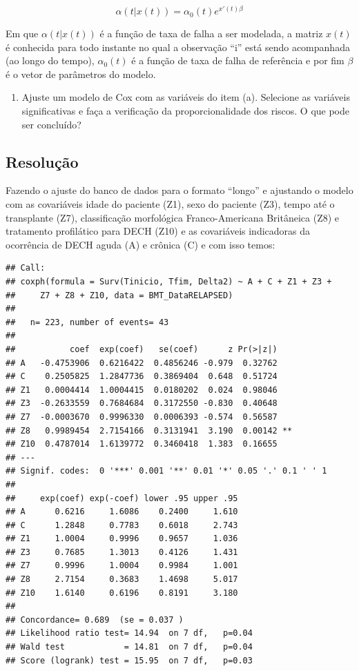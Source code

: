 \documentclass[]{article}
\providecommand{\tightlist}{%
  \setlength{\itemsep}{0pt}\setlength{\parskip}{0pt}}
\begin{document}
\[\alpha(t|x(t))=\alpha_0(t)e^{x'(t)\beta}\]

Em que \(\alpha(t|x(t))\) é a função de taxa de falha a ser modelada, a
matriz \(x(t)\) é conhecida para todo instante no qual a observação
``i'' está sendo acompanhada (ao longo do tempo), \(\alpha_0(t)\) é a
função de taxa de falha de referência e por fim \(\beta\) é o vetor de
parâmetros do modelo.

\begin{enumerate}
\def\labelenumi{(\alph{enumi})}
\setcounter{enumi}{1}
\tightlist
\item
  Ajuste um modelo de Cox com as variáveis do item (a). Selecione as
  variáveis significativas e faça a verificação da proporcionalidade dos
  riscos. O que pode ser concluído?
\end{enumerate}

\subsection{Resolução}\label{resolucao-1}

Fazendo o ajuste do banco de dados para o formato ``longo'' e ajustando
o modelo com as covariáveis idade do paciente (Z1), sexo do paciente
(Z3), tempo até o transplante (Z7), classificação morfológica
Franco-Americana Britâneica (Z8) e tratamento profilático para DECH
(Z10) e as covariáveis indicadoras da ocorrência de DECH aguda (A) e
crônica (C) e com isso temos:

\begin{verbatim}
## Call:
## coxph(formula = Surv(Tinicio, Tfim, Delta2) ~ A + C + Z1 + Z3 + 
##     Z7 + Z8 + Z10, data = BMT_DataRELAPSED)
## 
##   n= 223, number of events= 43 
## 
##           coef  exp(coef)   se(coef)      z Pr(>|z|)   
## A   -0.4753906  0.6216422  0.4856246 -0.979  0.32762   
## C    0.2505825  1.2847736  0.3869404  0.648  0.51724   
## Z1   0.0004414  1.0004415  0.0180202  0.024  0.98046   
## Z3  -0.2633559  0.7684684  0.3172550 -0.830  0.40648   
## Z7  -0.0003670  0.9996330  0.0006393 -0.574  0.56587   
## Z8   0.9989454  2.7154166  0.3131941  3.190  0.00142 **
## Z10  0.4787014  1.6139772  0.3460418  1.383  0.16655   
## ---
## Signif. codes:  0 '***' 0.001 '**' 0.01 '*' 0.05 '.' 0.1 ' ' 1
## 
##     exp(coef) exp(-coef) lower .95 upper .95
## A      0.6216     1.6086    0.2400     1.610
## C      1.2848     0.7783    0.6018     2.743
## Z1     1.0004     0.9996    0.9657     1.036
## Z3     0.7685     1.3013    0.4126     1.431
## Z7     0.9996     1.0004    0.9984     1.001
## Z8     2.7154     0.3683    1.4698     5.017
## Z10    1.6140     0.6196    0.8191     3.180
## 
## Concordance= 0.689  (se = 0.037 )
## Likelihood ratio test= 14.94  on 7 df,   p=0.04
## Wald test            = 14.81  on 7 df,   p=0.04
## Score (logrank) test = 15.95  on 7 df,   p=0.03
\end{verbatim}
\end{document}
